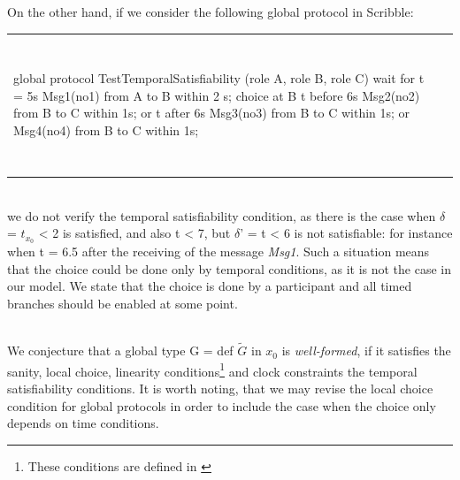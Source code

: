 \documentclass[a4paper,11pt,twoside]{report}
\newcommand{\G}{\ensuremath{G}}
\begin{document}
On the other hand, if we consider the following global protocol in Scribble:\\
\begin{tabular}{ll}
~&~\\
\begin{SJLISTING}
global protocol TestTemporalSatisfiability (role A, role B, role C) {
	wait for t = 5s
	Msg1(no1) from A to B within 2 s;
	choice at B {
		t before 6s
		Msg2(no2) from B to C within 1s;
	} or {
		t after 6s
		Msg3(no3) from B to C within 1s;
	} or {
		Msg4(no4) from B to C within 1s;
	}
}
\end{SJLISTING}
&\\
~&~\\
\end{tabular}\\
we do not verify the temporal satisfiability condition, as there is the case when $\delta$ = $t_{x_0}$ < 2 is satisfied, and also t < 7, but $\delta$' = t < 6 is not satisfiable: for instance when t = 6.5 after the receiving of the message \emph{Msg1}. Such a situation means that the choice could be done only by temporal conditions, as it is not the case in our model. We state that the choice is done by a participant and all timed branches should be enabled at some point.

~~\\

We conjecture that a global type G = def $\tilde{\G}$ in $x_{0}$ is \textit{well-formed}, if it satisfies the sanity, local choice, linearity conditions\footnote{These conditions are defined in \cite{denielou2012multiparty}} and clock constraints the temporal satisfiability conditions. It is worth noting, that we may revise the local choice condition for global protocols in order to include the case when the choice only depends on time conditions.
\end{document}
